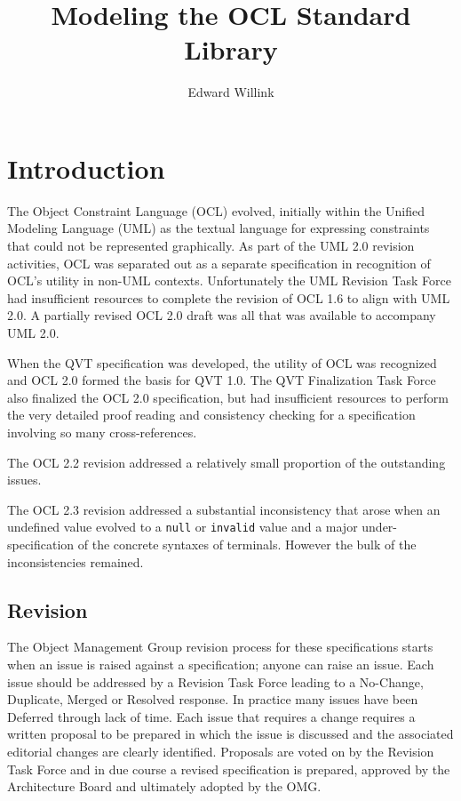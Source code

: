 \documentclass{eceasst}
\title{%
Modeling the OCL Standard Library}
\author{%
Edward Willink\autref{1}}
\institute{%
\autlabel{1} \email{ed \_at\_ willink.me.uk}, \url{http://www.eclipse.org/modeling}\\
Eclipse Modeling Project}
\begin{document}
\maketitle
\section{Introduction}

The Object Constraint Language (OCL) evolved, initially within the Unified Modeling Language (UML) as the textual language for expressing constraints that could not be represented graphically. As part of the UML 2.0\cite{UML-2.0} revision activities, OCL was separated out as a separate specification in recognition of OCL's utility in non-UML contexts. Unfortunately the UML Revision Task Force had insufficient resources to complete the revision of OCL 1.6\cite{OCL-1.6} to align with UML 2.0. A partially revised OCL 2.0 draft\cite{OCL-2.0-draft} was all that was available to accompany UML 2.0.

When the QVT specification was developed, the utility of OCL was recognized and OCL 2.0\cite{OCL-2.0} formed the basis for QVT 1.0\cite{QVT-1.0}. The QVT Finalization Task Force also finalized the OCL 2.0 specification, but had insufficient resources to perform the very detailed proof reading and consistency checking for a specification involving so many cross-references.

The OCL 2.2\cite{OCL-2.2} revision addressed a relatively small proportion of the outstanding issues.

The OCL 2.3\cite{OCL-2.3} revision addressed a substantial inconsistency that arose when an undefined value evolved to a \verb|null| or \verb|invalid| value and a major under-specification of the concrete syntaxes of terminals. However the bulk of the inconsistencies remained.

\subsection{Revision}

The Object Management Group revision process for these specifications starts when an issue is raised against a specification; anyone can raise an issue. Each issue should be addressed by a Revision Task Force leading to a No-Change, Duplicate, Merged or Resolved response. In practice many issues have been Deferred through lack of time. Each issue that requires a change requires a written proposal to be prepared in which the issue is discussed and the associated editorial changes are clearly identified. Proposals are voted on by the Revision Task Force and in due course a revised specification is prepared, approved by the Architecture Board and ultimately adopted by the OMG.
\end{document}

